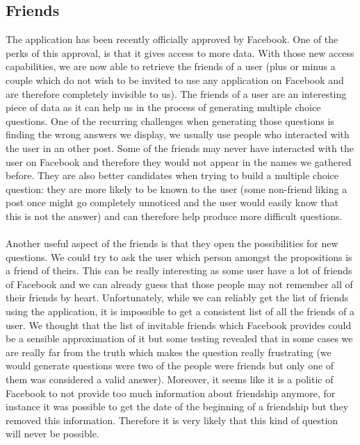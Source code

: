 \subsection{Friends}
The application has been recently officially approved by Facebook. One of the perks of this approval, is that it gives access to more data. With those new access capabilities, we are now able to retrieve the friends of a user (plus or minus a couple which do not wish to be invited to use any application on Facebook and are therefore completely invisible to us). The friends of a user are an interesting piece of data as it can help us in the process of generating multiple choice questions. One of the recurring challenges when generating those questions is finding the wrong answers we display, we usually use people who interacted with the user in an other post. Some of the friends may never have interacted with the user on Facebook and therefore they would not appear in the names we gathered before. They are also better candidates when trying to build a multiple choice question: they are more likely to be known to the user (some non-friend liking a post once might go completely unnoticed and the user would easily know that this is not the answer) and can therefore help produce more difficult questions.\\\\
Another useful aspect of the friends is that they open the possibilities for new questions. We could try to ask the user which person amongst the propositions is a friend of theirs. This can be really interesting as some user have a lot of friends of Facebook and we can already guess that those people may not remember all of their friends by heart. Unfortunately, while we can reliably get the list of friends using the application, it is impossible to get a consistent list of all the friends of a user. We thought that the list of invitable friends which Facebook provides could be a sensible approximation of it but some testing revealed that in some cases we are really far from the truth which makes the question really frustrating (we would generate questions were two of the people were friends but only one of them was considered a valid answer). Moreover, it seems like it is a politic of Facebook to not provide too much information about friendship anymore, for instance it was possible to get the date of the beginning of a friendship but they removed this information. Therefore it is very likely that this kind of question will never be possible.